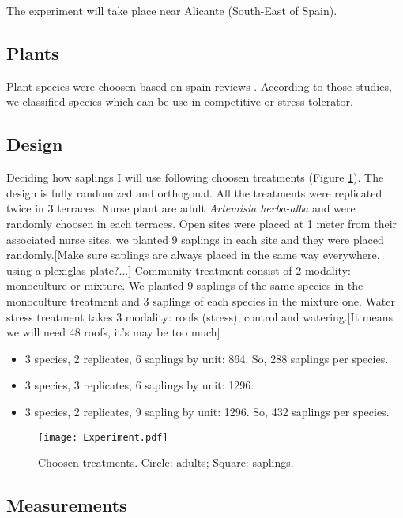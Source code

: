 \documentclass[12pt]{article} %
\begin{document}
The experiment will take place near Alicante (South-East of Spain).
\subsection{Plants}

Plant species were choosen based on spain reviews \citep{McCluney2012,Navarro2006, Jauffret2003}. According to those studies, we classified species which can be use in competitive or stress-tolerator. 



\subsection{Design}

Deciding how saplings I will use following choosen treatments (Figure \ref{exp}). The design is fully randomized and orthogonal. All the treatments were replicated twice in 3 terraces. Nurse plant are adult \textit{Artemisia herba-alba} and were randomly choosen in each terraces. Open sites were placed at 1 meter from their associated nurse sites. we planted 9 saplings in each site and they were placed randomly.[Make sure saplings are always placed in the same way everywhere, using a plexiglas plate?...] Community treatment consist of 2 modality: monoculture or mixture. We planted 9 saplings of the same species in the monoculture treatment and 3 saplings of each species in the mixture one. Water stress treatment takes 3 modality: roofs (stress), control and watering.[It means we will need 48 roofs, it's may be too much]

\begin{itemize}
\item 3 species, 2 replicates, 6 saplings by unit: 864. So, 288 saplings per species.
\item 3 species, 3 replicates, 6 saplings by unit: 1296.
\item 3 species, 2 replicates, 9 sapling by unit: 1296. So, 432 saplings per species.
\end{itemize}


\begin{figure} %
\begin{center}
\texttt{[image: Experiment.pdf]}
\end{center}
\caption{Choosen treatments. Circle: adults; Square: saplings. \label{exp}}
\end{figure}


\subsection{Measurements}
\end{document}
